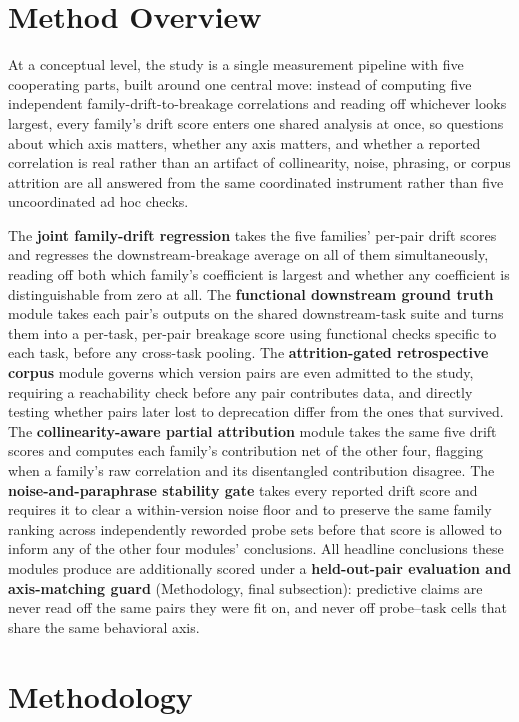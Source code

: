 \documentclass[11pt]{article}
\begin{document}
\section{Method Overview}

At a conceptual level, the study is a single measurement pipeline with five cooperating parts, built around one central move: instead of computing five independent family-drift-to-breakage correlations and reading off whichever looks largest, every family's drift score enters one shared analysis at once, so questions about which axis matters, whether any axis matters, and whether a reported correlation is real rather than an artifact of collinearity, noise, phrasing, or corpus attrition are all answered from the same coordinated instrument rather than five uncoordinated ad hoc checks.

The \textbf{joint family-drift regression} takes the five families' per-pair drift scores and regresses the downstream-breakage average on all of them simultaneously, reading off both which family's coefficient is largest and whether any coefficient is distinguishable from zero at all. The \textbf{functional downstream ground truth} module takes each pair's outputs on the shared downstream-task suite and turns them into a per-task, per-pair breakage score using functional checks specific to each task, before any cross-task pooling. The \textbf{attrition-gated retrospective corpus} module governs which version pairs are even admitted to the study, requiring a reachability check before any pair contributes data, and directly testing whether pairs later lost to deprecation differ from the ones that survived. The \textbf{collinearity-aware partial attribution} module takes the same five drift scores and computes each family's contribution net of the other four, flagging when a family's raw correlation and its disentangled contribution disagree. The \textbf{noise-and-paraphrase stability gate} takes every reported drift score and requires it to clear a within-version noise floor and to preserve the same family ranking across independently reworded probe sets before that score is allowed to inform any of the other four modules' conclusions. All headline conclusions these modules produce are additionally scored under a \textbf{held-out-pair evaluation and axis-matching guard} (Methodology, final subsection): predictive claims are never read off the same pairs they were fit on, and never off probe--task cells that share the same behavioral axis.

\section{Methodology}
\end{document}
